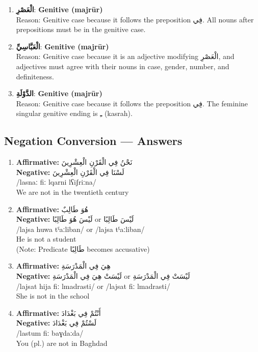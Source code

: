 \documentclass[letterpaper,12pt]{article}
\begin{document}
\begin{enumerate}
\item \textbf{\textarabic{الْعَصْرِ}}: \textbf{Genitive (majrūr)}\\
Reason: Genitive case because it follows the preposition \textarabic{فِي}. All nouns after prepositions must be in the genitive case.

\item \textbf{\textarabic{الْعَبَّاسِيِّ}}: \textbf{Genitive (majrūr)}\\
Reason: Genitive case because it is an adjective modifying \textarabic{الْعَصْرِ}, and adjectives must agree with their nouns in case, gender, number, and definiteness.

\item \textbf{\textarabic{الدَّوْلَةِ}}: \textbf{Genitive (majrūr)}\\
Reason: Genitive case because it follows the preposition \textarabic{فِي}. The feminine singular genitive ending is \textarabic{ـِ} (kasrah).
\end{enumerate}

\subsection{Negation Conversion — Answers}

\begin{enumerate}
\item \textbf{Affirmative:} \textarabic{نَحْنُ فِي الْقَرْنِ الْعِشْرِينَ}\\
\textbf{Negative:} \textarabic{لَسْنَا فِي الْقَرْنِ الْعِشْرِينَ}\\
/lasnaː fiː lqarni lʕiʃriːna/\\
We are not in the twentieth century

\item \textbf{Affirmative:} \textarabic{هُوَ طَالِبٌ}\\
\textbf{Negative:} \textarabic{لَيْسَ هُوَ طَالِبًا} or \textarabic{لَيْسَ طَالِبًا}\\
/lajsa huwa tˤaːliban/ or /lajsa tˤaːliban/\\
He is not a student\\
(Note: Predicate \textarabic{طَالِبًا} becomes accusative)

\item \textbf{Affirmative:} \textarabic{هِيَ فِي الْمَدْرَسَةِ}\\
\textbf{Negative:} \textarabic{لَيْسَتْ هِيَ فِي الْمَدْرَسَةِ} or \textarabic{لَيْسَتْ فِي الْمَدْرَسَةِ}\\
/lajsat hija fiː lmadrasti/ or /lajsat fiː lmadrasti/\\
She is not in the school

\item \textbf{Affirmative:} \textarabic{أَنْتُمْ فِي بَغْدَادَ}\\
\textbf{Negative:} \textarabic{لَسْتُمْ فِي بَغْدَادَ}\\
/lastum fiː baɣdaːda/\\
You (pl.) are not in Baghdad
\end{enumerate}
\end{document}
